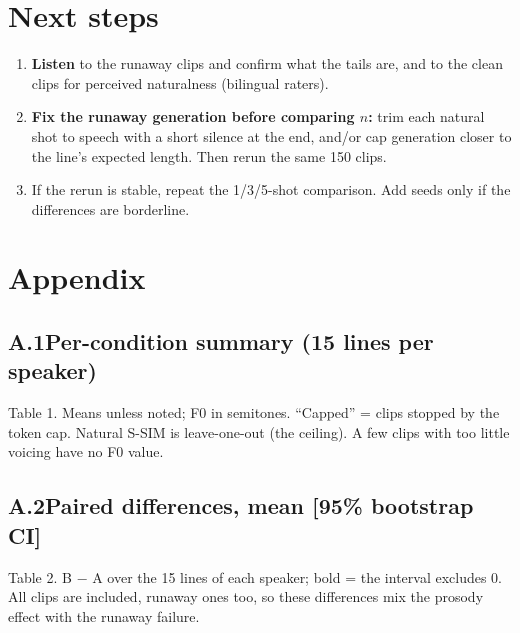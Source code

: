 \documentclass[11pt]{article}
\begin{document}
\section*{Next steps}
\begin{enumerate}
\item \textbf{Listen} to the runaway clips and confirm what the tails are, and to the clean clips for perceived naturalness (bilingual raters).
\item \textbf{Fix the runaway generation before comparing $n$:} trim each natural shot to speech with a short silence at the end, and/or cap generation closer to the line's expected length. Then rerun the same 150 clips.
\item If the rerun is stable, repeat the 1/3/5-shot comparison. Add seeds only if the differences are borderline.
\end{enumerate}

\section*{Appendix}
\subsection*{A.1\quad Per-condition summary (15 lines per speaker)}
\begin{center}\small\end{center}
Table 1. Means unless noted; F0 in semitones. ``Capped'' = clips stopped by the token cap. Natural S-SIM is leave-one-out (the ceiling). A few clips with too little voicing have no F0 value.

\subsection*{A.2\quad Paired differences, mean [95\% bootstrap CI]}
\begin{center}\scriptsize\setlength{\tabcolsep}{3pt}\end{center}
Table 2. B $-$ A over the 15 lines of each speaker; bold = the interval excludes 0. All clips are included, runaway ones too, so these differences mix the prosody effect with the runaway failure.
\end{document}
